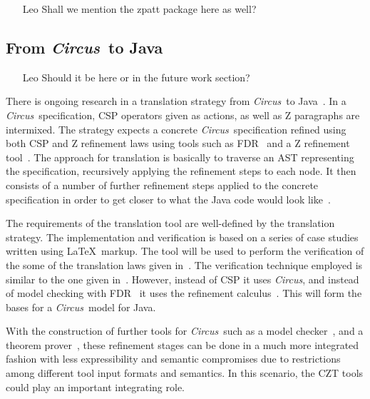 \documentclass{llncs}
\newcommand{\Circus}{{\sf\slshape Circus}}
\begin{document}
\begin{itemize}
    \item[Leo] Shall we mention the zpatt package here as well?
\end{itemize}

\subsection{From \Circus\ to Java}

\begin{itemize}
    \item[Leo] Should it be here or in the future work section?
\end{itemize}

There is ongoing research in a translation strategy from \Circus\ to Java~\cite{angela-2005}.
In a \Circus\ specification, CSP operators given as actions, as well as Z paragraphs are intermixed.
The strategy expects a concrete \Circus\ specification refined using both CSP and Z refinement laws
using tools such as FDR~\cite{csp.tools:fdrm} and a Z refinement tool~\cite{angela-2003}.
The approach for translation is basically to traverse an AST representing the specification,
recursively applying the refinement steps to each node.
It then consists of a number of further refinement steps applied to the concrete specification in
order to get closer to what the Java code would look like~\cite{marcel-2004}.

The requirements of the translation tool are well-defined by the translation strategy.
The implementation and verification is based on a series of case studies written using \LaTeX\ markup.
The tool will be used to perform the verification of the some of the translation laws given in~\cite{marcel-2004}.
The verification technique employed is similar to the one given in~\cite{welch-martin2000}.
However, instead of CSP it uses \Circus, and instead of model checking with FDR~\cite{csp.tools:fdrm} it
uses the refinement calculus~\cite{fm.ref:morgan}.
This will form the bases for a \Circus\ model for Java.

With the construction of further tools for \Circus\ such as a model checker~\cite{circus.mc:leo},
and a theorem prover~\cite{circus.sem:pp}, these refinement stages can be done in a much more
integrated fashion with less expressibility and semantic compromises due to restrictions among
different tool input formats and semantics.
In this scenario, the CZT tools could play an important integrating role.
\end{document}
